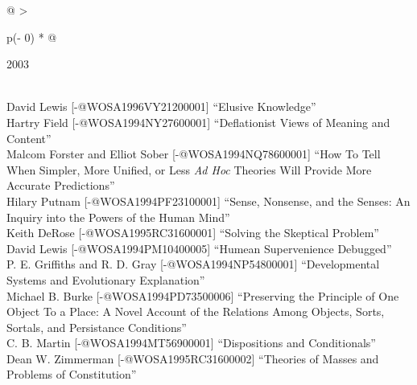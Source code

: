 \documentclass[
  10pt,
  letterpaper,
  DIV=11,
  numbers=noendperiod,
  twoside]{scrartcl}
\begin{document}
\begin{longtable}[]{@{}
  >{\raggedright\arraybackslash}p{(\columnwidth - 0\tabcolsep) * }@{}}

\caption{\label{tbl-top-ten-1994}Most cited articles published less than
ten years ago as of 2003.}

\tabularnewline

\toprule\noalign{}
\begin{minipage}[b]{\linewidth}\raggedright
2003
\end{minipage} \\
\midrule\noalign{}
\endhead
\bottomrule\noalign{}
\endlastfoot
David Lewis {[}-@WOSA1996VY21200001{]} ``Elusive Knowledge'' \\
Hartry Field {[}-@WOSA1994NY27600001{]} ``Deflationist Views of Meaning
and Content'' \\
Malcom Forster and Elliot Sober {[}-@WOSA1994NQ78600001{]} ``How To Tell
When Simpler, More Unified, or Less \emph{Ad Hoc} Theories Will Provide
More Accurate Predictions'' \\
Hilary Putnam {[}-@WOSA1994PF23100001{]} ``Sense, Nonsense, and the
Senses: An Inquiry into the Powers of the Human Mind'' \\
Keith DeRose {[}-@WOSA1995RC31600001{]} ``Solving the Skeptical
Problem'' \\
David Lewis {[}-@WOSA1994PM10400005{]} ``Humean Supervenience
Debugged'' \\
P. E. Griffiths and R. D. Gray {[}-@WOSA1994NP54800001{]}
``Developmental Systems and Evolutionary Explanation'' \\
Michael B. Burke {[}-@WOSA1994PD73500006{]} ``Preserving the Principle
of One Object To a Place: A Novel Account of the Relations Among
Objects, Sorts, Sortals, and Persistance Conditions'' \\
C. B. Martin {[}-@WOSA1994MT56900001{]} ``Dispositions and
Conditionals'' \\
Dean W. Zimmerman {[}-@WOSA1995RC31600002{]} ``Theories of Masses and
Problems of Constitution'' \\

\end{longtable}
\end{document}
